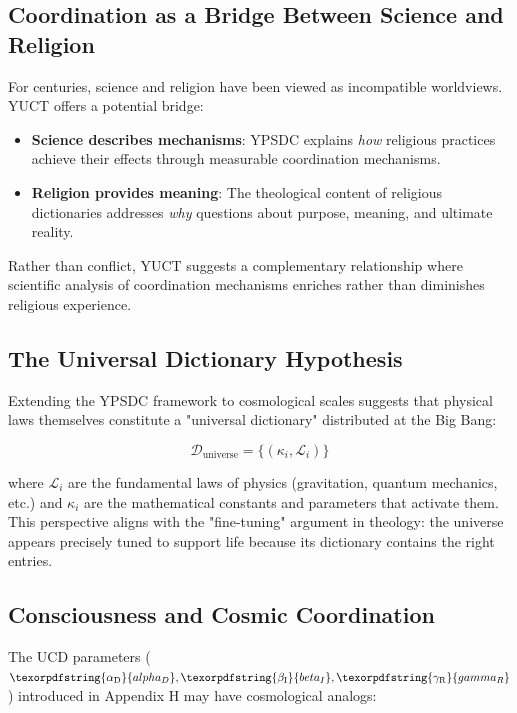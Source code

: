 \documentclass[12pt,a4paper]{article}
\DeclareRobustCommand{\alD}{\texorpdfstring{\ensuremath{\alpha_{\mathrm{D}}}}{alpha_D}}
\DeclareRobustCommand{\beI}{\texorpdfstring{\ensuremath{\beta_{\mathrm{I}}}}{beta_I}}
\DeclareRobustCommand{\gaR}{\texorpdfstring{\ensuremath{\gamma_{\mathrm{R}}}}{gamma_R}}
\begin{document}
	\subsection{Coordination as a Bridge Between Science and Religion}
	
	For centuries, science and religion have been viewed as incompatible worldviews. YUCT offers a potential bridge:
	
	\begin{itemize}
		\item \textbf{Science describes mechanisms}: YPSDC explains \textit{how} religious practices achieve their effects through measurable coordination mechanisms.
		
		\item \textbf{Religion provides meaning}: The theological content of religious dictionaries addresses \textit{why} questions about purpose, meaning, and ultimate reality.
	\end{itemize}
	
	Rather than conflict, YUCT suggests a complementary relationship where scientific analysis of coordination mechanisms enriches rather than diminishes religious experience.
	
	\subsection{The Universal Dictionary Hypothesis}
	
	Extending the YPSDC framework to cosmological scales suggests that physical laws themselves constitute a "universal dictionary" distributed at the Big Bang:
	
	\[
	\mathcal{D}_{\mathrm{universe}} = \{ (\kappa_i, \mathcal{L}_i) \}
	\]
	
	where $\mathcal{L}_i$ are the fundamental laws of physics (gravitation, quantum mechanics, etc.) and $\kappa_i$ are the mathematical constants and parameters that activate them. This perspective aligns with the "fine-tuning" argument in theology: the universe appears precisely tuned to support life because its dictionary contains the right entries.
	
	\subsection{Consciousness and Cosmic Coordination}
	
	The UCD parameters ($\alD, \beI, \gaR$) introduced in Appendix H may have cosmological analogs:
	
\end{document}
